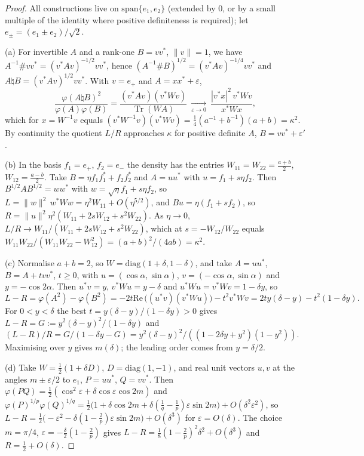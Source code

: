\documentclass[11pt]{article}
\DeclareMathOperator{\Tr}{Tr}
\renewcommand{\Re}{\mathrm{Re}\,}
\theoremstyle{plain}
\theoremstyle{definition}
\theoremstyle{remark}
\begin{document}
\begin{proof}
All constructions live on $\mathrm{span}\{e_1,e_2\}$ (extended by $0$, or by a small multiple of the identity where
positive definiteness is required); let $e_\pm=(e_1\pm e_2)/\sqrt2$.

(a) For invertible $A$ and a rank-one $B=vv^*$, $\|v\|=1$, we have $A^{-1}\#vv^*=(v^*Av)^{-1/2}vv^*$, hence
$(A^{-1}\#B)^{1/2}=(v^*Av)^{-1/4}vv^*$ and $A\natural B=(v^*Av)^{1/2}vv^*$. With $v=e_+$ and $A=xx^*+\varepsilon$,
\[
  \frac{\varphi(A\natural B)^2}{\varphi(A)\varphi(B)}=\frac{(v^*Av)(v^*Wv)}{\Tr(WA)}\ \xrightarrow[\varepsilon\to0]{}\
  \frac{|v^*x|^2\,v^*Wv}{x^*Wx},
\]
which for $x=W^{-1}v$ equals $(v^*W^{-1}v)(v^*Wv)=\frac14(a^{-1}+b^{-1})(a+b)=\kappa^2$. By continuity the quotient
$L/R$ approaches $\kappa$ for positive definite $A$, $B=vv^*+\varepsilon'$.

(b) In the basis $f_1=e_+$, $f_2=e_-$ the density has the entries $W_{11}=W_{22}=\frac{a+b}2$, $W_{12}=\frac{a-b}2$. Take
$B=\eta f_1f_1^*+f_2f_2^*$ and $A=uu^*$ with $u=f_1+s\eta f_2$. Then $B^{1/2}AB^{1/2}=ww^*$ with $w=\sqrt\eta f_1+s\eta f_2$,
so $L=\|w\|^2\,w^*Ww=\eta^2W_{11}+O(\eta^{5/2})$, and $Bu=\eta(f_1+sf_2)$, so $R=\|u\|^2\eta^2(W_{11}+2sW_{12}+s^2W_{22})$.
As $\eta\to0$, $L/R\to W_{11}/(W_{11}+2sW_{12}+s^2W_{22})$, which at $s=-W_{12}/W_{22}$ equals
$W_{11}W_{22}/(W_{11}W_{22}-W_{12}^2)=(a+b)^2/(4ab)=\kappa^2$.

(c) Normalise $a+b=2$, so $W=\mathrm{diag}(1+\delta,1-\delta)$, and take $A=uu^*$, $B=A+tvv^*$, $t\ge0$, with
$u=(\cos\alpha,\sin\alpha)$, $v=(-\cos\alpha,\sin\alpha)$ and $y=-\cos2\alpha$. Then $u^*v=y$, $v^*Wu=y-\delta$ and
$u^*Wu=v^*Wv=1-\delta y$, so
\[
  L-R=\varphi(A^2)-\varphi(B^2)=-2t\Re\bigl((u^*v)(v^*Wu)\bigr)-t^2v^*Wv=2ty(\delta-y)-t^2(1-\delta y).
\]
For $0<y<\delta$ the best $t=y(\delta-y)/(1-\delta y)>0$ gives $L-R=G:=y^2(\delta-y)^2/(1-\delta y)$ and
$(L-R)/R=G/(1-\delta y-G)=y^2(\delta-y)^2/((1-2\delta y+y^2)(1-y^2))$. Maximising over $y$ gives $m(\delta)$; the leading
order comes from $y=\delta/2$.

(d) Take $W=\frac12(1+\delta D)$, $D=\mathrm{diag}(1,-1)$, and real unit vectors $u,v$ at the angles $m\pm\varepsilon/2$ to
$e_1$, $P=uu^*$, $Q=vv^*$. Then $\varphi(PQ)=\frac12(\cos^2\varepsilon+\delta\cos\varepsilon\cos2m)$ and
$\varphi(P)^{1/p}\varphi(Q)^{1/q}=\frac12\bigl(1+\delta\cos2m+\delta(\frac1q-\frac1p)\varepsilon\sin2m\bigr)+O(\delta^2\varepsilon^2)$,
so $L-R=\frac12\bigl(-\varepsilon^2-\delta(1-\frac2p)\varepsilon\sin2m\bigr)+O(\delta^3)$ for $\varepsilon=O(\delta)$. The choice
$m=\pi/4$, $\varepsilon=-\frac\delta2(1-\frac2p)$ gives $L-R=\frac18(1-\frac2p)^2\delta^2+O(\delta^3)$ and $R=\frac12+O(\delta)$.
\end{proof}
\end{document}
